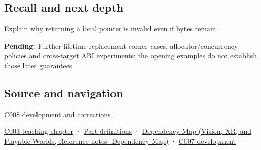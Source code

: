 \subsection{Recall and next depth}\label{appendix-0b104bcba06b-recall-and-next-depth}

Explain why returning a local pointer is invalid even if bytes remain.

\textbf{Pending:} Further lifetime replacement corner cases, allocator/concurrency policies and cross-target ABI experiments; the opening examples do not establish those later guarantees.

\subsection{Source and navigation}\label{appendix-0b104bcba06b-source-and-navigation}

\hyperref[appendix-fd090d982a15-m008---parts-113-126]{C008 development and corrections}

\hyperref[01-foundations-i-ch002-where-the-bytes-live]{C003 teaching chapter} · \hyperref[appendix-fd090d982a15-m003---parts-41-60]{Part definitions} · \href{../07-Vision-XR-and-Playable-Worlds/main.pdf\#nameddest=appendix-4ad47bdd269a}{Dependency Map (Vision, XR, and Playable Worlds, Reference notes: Dependency Map)} · \hyperref[01-foundations-i-ch002-storage-is-a-place-an-object-is-its-occupant]{C007 development}
